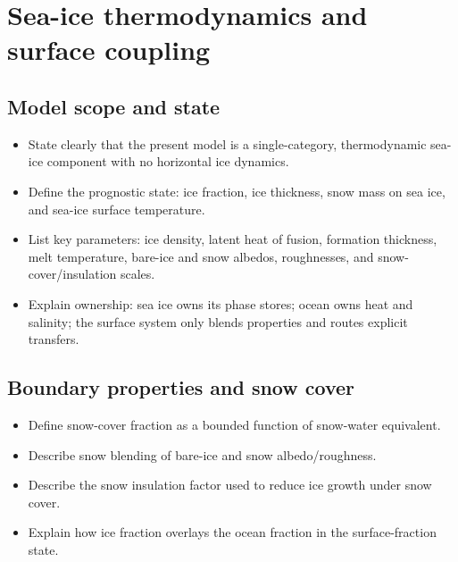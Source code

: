
\section{Sea-ice thermodynamics and surface coupling}\label{sec:sea-ice}

\subsection{Model scope and state}
\begin{itemize}
  \item State clearly that the present model is a single-category, thermodynamic sea-ice component with no horizontal ice dynamics.
  \item Define the prognostic state: ice fraction, ice thickness, snow mass on sea ice, and sea-ice surface temperature.
  \item List key parameters: ice density, latent heat of fusion, formation thickness, melt temperature, bare-ice and snow albedos, roughnesses, and snow-cover/insulation scales.
  \item Explain ownership: sea ice owns its phase stores; ocean owns heat and salinity; the surface system only blends properties and routes explicit transfers.
\end{itemize}
\subsection{Boundary properties and snow cover}
\begin{itemize}
  \item Define snow-cover fraction as a bounded function of snow-water equivalent.
  \item Describe snow blending of bare-ice and snow albedo/roughness.
  \item Describe the snow insulation factor used to reduce ice growth under snow cover.
  \item Explain how ice fraction overlays the ocean fraction in the surface-fraction state.
\end{itemize}

